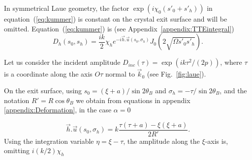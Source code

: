 \documentclass[preprint]{iucr}              %
\newcommand{\inred}[1]{{\color{red}#1}}
\begin{document}
\inred{In} symmetrical Laue geometry, the factor $\exp(i \chi_0 (s'_0+s'_h))$ in equation~(\ref{eq:kummer}) is constant \inred{ on the crystal exit surface and will be omitted. Equation~(\ref{eq:kummer}) is (see Appendix~\ref{appendix:TTEintegral})}
\begin{equation}
\label{eq:DhSymmetricalLaue}
    D_h(s_0,s_h) = \frac{i k}{2} \chi_h e^{-i \vec h . \vec u(s_0,\sigma_h)}
    J_0(2\sqrt{\Omega s'_0 s'_h}).
\end{equation}

Let us consider the incident amplitude $D_{inc}(\tau)=\exp(i k \tau^2/(2p))$, where $\tau$ is a coordinate along the axis $O\tau$ normal to $\vec k_0$ (see Fig.~\ref{fig:laue}). \inred{On the exit surface, using $s_0=(\xi+a)/\sin2\theta_B$ and $\sigma_h=-\tau/\sin2\theta_B$, and the notation $R'=R\cos\theta_B$ we obtain \inred{from equations in appendix \ref{appendix:Deformation}, in the case $\alpha=0$}

\begin{equation}
    \vec h . \vec u(s_0,\sigma_h) = k \frac{\tau(\tau+a)-\xi(\xi+a)}{ 2R'}.
\end{equation}
Using the integration variable $\eta=\xi-\tau$, the amplitude along the $\xi$-axis is, omitting $i(k/2)\chi_h$
}
\end{document}
